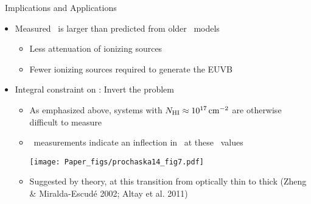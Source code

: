 \documentclass[12pt,letterpaper]{article}
\begin{document}
\begin{Aenumerate}
\begin{itemize}
\begin{itemize}
\begin{itemize}
  		\end{itemize}

  	\end{itemize}
  \end{itemize}

{\bf \item \lmfp\ Implications and Applications}
  \begin{itemize}

  \item Measured \lmfp\ is larger than predicted from older \fnhi\ models
  	\begin{itemize}
  	\item Less attenuation of ionizing sources
  	\item Fewer ionizing sources required to generate the EUVB
  	\end{itemize}

  \item Integral constraint on \fnhi: Invert the problem
  	\begin{itemize}
  	\item As emphasized above, systems with $N_{\rm HI} \approx 10^{17} \, {\rm cm^{-2}}$
  	are otherwise difficult to measure
  	\item \lmfp\ measurements indicate an inflection in \fnhi\ at these
  	\nhi\ values

\texttt{[image: Paper\_figs/prochaska14\_fig7.pdf]}

  	\item Suggested by theory, at this transition from optically thin to thick
  	(Zheng \& Miralda-Escud\'e 2002; Altay et al. 2011)
  	\end{itemize}


\end{itemize}
\end{Aenumerate}
\end{document}
